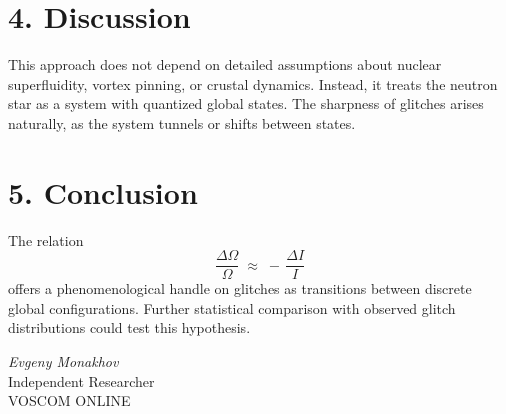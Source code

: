\documentclass[a4paper,12pt]{article}
\begin{document}
\section*{4. Discussion}
This approach does not depend on detailed assumptions about nuclear superfluidity, vortex pinning, or crustal dynamics. Instead, it treats the neutron star as a system with quantized global states. The sharpness of glitches arises naturally, as the system tunnels or shifts between states.

\section*{5. Conclusion}
The relation
\[
\frac{\Delta \Omega}{\Omega} \;\approx\; -\, \frac{\Delta I}{I}
\]
offers a phenomenological handle on glitches as transitions between discrete global configurations. Further statistical comparison with observed glitch distributions could test this hypothesis.

\vspace{2em}
\noindent
\textit{Evgeny Monakhov} \\
Independent Researcher \\
VOSCOM ONLINE
\end{document}
